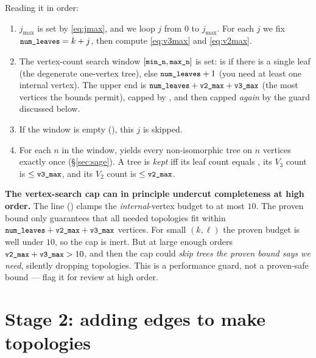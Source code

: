 Reading it in order:

\begin{enumerate}
  \item $j_{\max}$ is set by \eqref{eq:jmax}, and we loop $j$ from $0$ to
        $j_{\max}$. For each $j$ we fix $\texttt{\small num\_leaves}=k+j$, then compute
         \eqref{eq:v3max} and  \eqref{eq:v2max}.
  \item The vertex-count search window $[\texttt{\small min\_n}, \texttt{\small max\_n}]$ is set:
         is  if there is a single leaf (the
        degenerate one-vertex tree), else $\texttt{\small num\_leaves}+1$ (you need at
        least one internal vertex). The upper end is $\texttt{\small num\_leaves}+
        \texttt{\small v2\_max}+\texttt{\small v3\_max}$ (the most vertices the bounds permit),
        capped by , and then capped \emph{again} by
        the  guard discussed below.
  \item If the window is empty (), this $j$ is skipped.
  \item For each $n$ in the window,  yields every
        non-isomorphic tree on $n$ vertices exactly once (\S\ref{sec:sage}). A
        tree is \emph{kept} iff its leaf count equals , its
        $V_3$ count is $\le\texttt{\small v3\_max}$, and its $V_2$ count is
        $\le\texttt{\small v2\_max}$.
\end{enumerate}

\begin{gotcha}
\label{gotcha:plus10}
\textbf{The  vertex-search cap can in principle undercut completeness at
high order.} The line
() clamps the \emph{internal}-vertex
budget to at most $10$. The proven bound only guarantees that all needed
topologies fit within $\texttt{\small num\_leaves}+\texttt{\small v2\_max}+\texttt{\small v3\_max}$
vertices. For small $(k,\ell)$ the proven budget is well under $10$, so the cap is
inert. But at large enough orders $\texttt{\small v2\_max}+\texttt{\small v3\_max} > 10$, and then
the cap could \emph{skip trees the proven bound says we need}, silently dropping
topologies. This is a performance guard, not a proven-safe bound --- flag it for
review at high order.
\end{gotcha}

\section{Stage 2: adding edges to make topologies}

